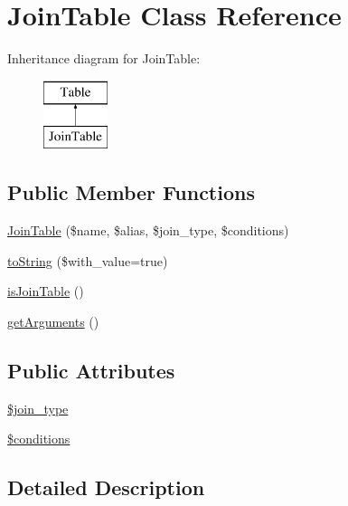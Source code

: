 \hypertarget{classJoinTable}{\section{Join\-Table Class Reference}
\label{classJoinTable}
}
Inheritance diagram for Join\-Table\-:\begin{figure}[H]
\begin{center}
\leavevmode
\includegraphics[height=2.000000cm]{classJoinTable}
\end{center}
\end{figure}
\subsection*{Public Member Functions}
\begin{DoxyCompactItemize}
\item 
\hyperlink{classJoinTable_a70859ad638b9149e97b8209d4f73610e}{Join\-Table} (\$name, \$alias, \$join\-\_\-type, \$conditions)
\item 
\hyperlink{classJoinTable_aa1e393a7b04e3b591ebd0fe6dff46f42}{to\-String} (\$with\-\_\-value=true)
\item 
\hyperlink{classJoinTable_aa26630df96bb0dac2ddcccff34c91530}{is\-Join\-Table} ()
\item 
\hyperlink{classJoinTable_a2f8aae7c1c5d0879f1085b9280018b4e}{get\-Arguments} ()
\end{DoxyCompactItemize}
\subsection*{Public Attributes}
\begin{DoxyCompactItemize}
\item 
\hyperlink{classJoinTable_a00c6a8c44beb3b85c9f3a3e5be03fba8}{\$join\-\_\-type}
\item 
\hyperlink{classJoinTable_aeaff6b550d1e29eef836ed19a8d65a99}{\$conditions}
\end{DoxyCompactItemize}


\subsection{Detailed Description}


